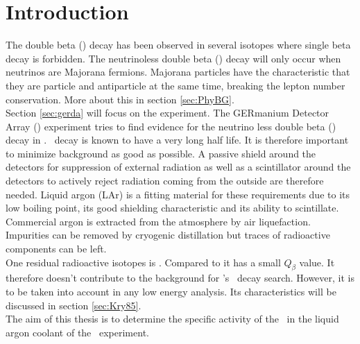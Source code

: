 \documentclass[encoding=utf8,british]{tumphthesis}
\begin{document}
\tableofcontents

\mainmatter

\chapter{Introduction}
\label{sec:intro}

The double beta (\twonu) decay has been observed in several isotopes where single beta decay is forbidden.
The neutrinoless double beta (\onbb) decay will only occur when neutrinos are Majorana fermions.
Majorana particles have the characteristic that they are particle and antiparticle at the same time, breaking the lepton number conservation.
More about this in section \ref{sec:PhyBG}.
\\

Section \ref{sec:gerda} will focus on the \gerda experiment.
The GERmanium Detector Array (\gerda) experiment tries to find evidence for the neutrino less double beta (\onbb) decay in .
\onbb\ decay is known to have a very long half life.
It is therefore important to minimize background as good as possible. 
A passive shield around the detectors for suppression of external radiation as well as a scintillator around the detectors to actively reject radiation coming from the outside are therefore needed.
Liquid argon (LAr) is a fitting material for these requirements due to its low boiling point, its good shielding characteristic and its ability to scintillate. 
Commercial argon is extracted from the atmosphere by air liquefaction. 
Impurities can be removed by cryogenic distillation but traces of radioactive components can be left.
\\

One residual radioactive isotopes is \Kr. 
Compared to  it has a small $Q_\beta$ value.
It therefore doesn't contribute to the background for \gerda's \onbb\ decay search.
However, it is to be taken into account in any low energy analysis.
Its characteristics will be discussed in section \ref{sec:Kry85}.
\\

The aim of this thesis is to determine the specific activity of the \Kr\ in the liquid argon coolant of the \gerda\ experiment. 
\\


\end{document}
